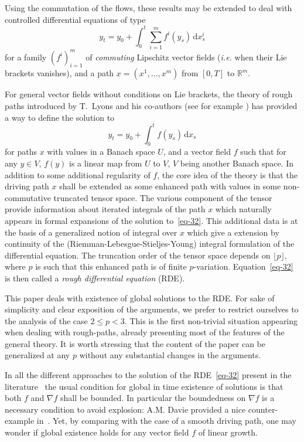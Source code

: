 \documentclass[a4paper,12pt]{article}
\theoremstyle{definition}
\newcommand{\vd}{\,\mathrm{d}}
\newcommand{\RR}{\mathbb{R}}
\begin{document}
Using the commutation of the flows, these results may be extended to deal 
with controlled differential equations of type
\begin{equation*}
y_t=y_0+\int_0^t \sum_{i=1}^m f^i(y_s)\vd x_s^i
\end{equation*}
for a family $(f^i)_{i=1}^m$ of \emph{commuting} Lipschitz vector fields 
(\textit{i.e.} when their Lie brackets vanishes), 
and a path $x=(x^1,\dotsc,x^m)$ from $[0,T]$ to $\RR^m$.

For general vector fields without conditions on Lie brackets, the theory
of rough paths introduced by T.~Lyons and his co-authors 
(see for example \cites{friz06c,gubinelli04a,lejay-rp,lejay-rp2,lyons98a,lyons02b,lyons06b}) has provided 
a way to define the solution to 
\begin{equation}
\label{eq-32}
y_t=y_0+\int_0^t f(y_s)\vd x_s
\end{equation}
for paths $x$ with values in a Banach space $U$, and a vector field $f$ 
such that for any $y\in V$,  $f(y)$ is a linear map from $U$ to $V$, $V$ being another Banach space.
In addition to some additional regularity of $f$, the core idea of the theory
is that the driving path $x$ shall be extended as some enhanced path
with values in some non-commutative truncated tensor space. 
The various component of the tensor provide information about iterated integrals of the path $x$ which naturally appears in formal expansions of the solution to~\eqref{eq-32}. This additional data is at the basis of a generalized notion of integral over $x$ which give a extension by continuity of the (Riemman-Lebesgue-Stieljes-Young)  integral formulation of the differential equation. 
The truncation
order of the tensor space depends on $\lfloor p\rfloor$, where $p$ is 
such that this enhanced path is of finite $p$-variation.
Equation~\eqref{eq-32} is then called a \emph{rough differential equation} (RDE).

\medskip
This paper deals with existence of global solutions to the RDE.
For sake of simplicity and clear exposition of the arguments, we prefer to  restrict ourselves to the analysis of the case $2\le p< 3$. This is  the first non-trivial situation appearing when dealing with rough-paths, already presenting most of the features of the general  theory. It is worth stressing that the content of the paper can be generalized at any $p$ without any substantial changes in the arguments.

In all the different approaches to the solution of the RDE~\eqref{eq-32} present in the literature~\cites{lyons98a,feyel, davie05a, gubinelli04a}  the usual condition for global in time existence of solutions
is that both $f$ and $\nabla f$ shall be bounded.
In particular the boundedness on $\nabla f$ is a necessary condition to 
avoid explosion:  A.M. Davie provided a nice counter-example in~\cite{davie05a}.
Yet, by comparing
with the case of a smooth driving path, one may wonder if global 
existence holds for any vector field $f$ of linear growth.
\end{document}
